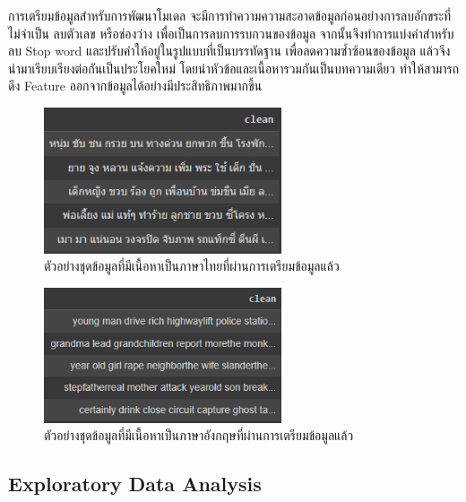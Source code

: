 \documentclass[12pt,oneside,openright,a4paper]{cpe-thai-project}
\begin{document}
      \hspace{1cm}การเตรียมข้อมูลสำหรับการพัฒนาโมเดล จะมีการทำความความสะอาดข้อมูลก่อนอย่างการลบอักขระที่ไม่จำเป็น ลบตัวเลข หรือช่องว่าง
      เพื่อเป็นการลบการรบกวนของข้อมูล จากนั้นจึงทำการแบ่งคำสำหรับลบ Stop word และปรับคำให้อยู่ในรูปแบบที่เป็นบรรทัดฐาน เพื่อลดความซ้ำซ้อนของข้อมูล
      แล้วจึงนำมาเรียบเรียงต่อกันเป็นประโยคใหม่ โดยนำหัวข้อและเนื้อหารวมกันเป็นบทความเดียว ทำให้สามารถดึง Feature ออกจากข้อมูลได้อย่างมีประสิทธิภาพมากขึ้น
      \newpage
      \begin{figure}[!ht]\centering
        \includegraphics[width=7cm]{./img/new_th_train.png}
        \caption{ตัวอย่างชุดข้อมูลที่มีเนื้อหาเป็นภาษาไทยที่ผ่านการเตรียมข้อมูลแล้ว}\label{fig:new_th_train}
      \end{figure}

      \begin{figure}[!ht]\centering
        \includegraphics[width=7cm]{./img/news_eng_train.png}
        \caption{ตัวอย่างชุดข้อมูลที่มีเนื้อหาเป็นภาษาอังกฤษที่ผ่านการเตรียมข้อมูลแล้ว}\label{fig:new_eng_train}
      \end{figure}

    \subsection{Exploratory Data Analysis}
\end{document}
